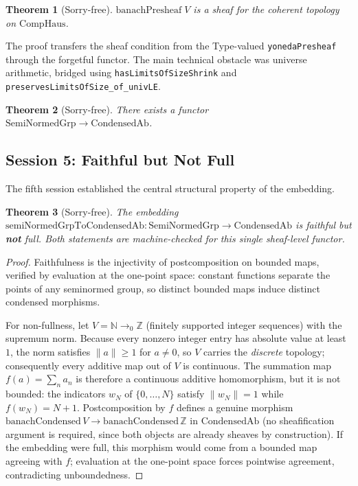 \documentclass[11pt]{amsart}
\theoremstyle{plain}
\newtheorem{theorem}{Theorem}[section]
\theoremstyle{definition}
\newcommand{\CondAb}{\mathrm{CondensedAb}}
\newcommand{\CompHaus}{\mathrm{CompHaus}}
\newcommand{\SemiNormedGrp}{\mathrm{SemiNormedGrp}}
\begin{document}
\begin{theorem}[Sorry-free]
\label{thm:sheaf}
$\mathrm{banachPresheaf}\;V$ is a sheaf for the coherent topology on $\CompHaus$.
\end{theorem}

The proof transfers the sheaf condition from the Type-valued \texttt{yonedaPresheaf} through the forgetful functor. The main technical obstacle was universe arithmetic, bridged using \texttt{hasLimitsOfSizeShrink} and \texttt{preservesLimitsOfSize\_of\_univLE}.

\begin{theorem}[Sorry-free]
There exists a functor $\SemiNormedGrp \to \CondAb$.
\end{theorem}

\subsection{Session 5: Faithful but Not Full}

The fifth session established the central structural property of the embedding.

\begin{theorem}[Sorry-free]
\label{thm:fullness}
The embedding $\mathrm{semiNormedGrpToCondensedAb} : \SemiNormedGrp \to \CondAb$ is faithful but \textbf{not} full. Both statements are machine-checked for this single sheaf-level functor.
\end{theorem}

\begin{proof}
Faithfulness is the injectivity of postcomposition on bounded maps, verified by evaluation at the one-point space: constant functions separate the points of any seminormed group, so distinct bounded maps induce distinct condensed morphisms.

For non-fullness, let $V = \mathbb{N} \to_0 \mathbb{Z}$ (finitely supported integer sequences) with the supremum norm. Because every nonzero integer entry has absolute value at least $1$, the norm satisfies $\|a\| \ge 1$ for $a \neq 0$, so $V$ carries the \emph{discrete} topology; consequently every additive map out of $V$ is continuous. The summation map $f(a) = \sum_n a_n$ is therefore a continuous additive homomorphism, but it is not bounded: the indicators $w_N$ of $\{0, \dots, N\}$ satisfy $\|w_N\| = 1$ while $f(w_N) = N+1$. Postcomposition by $f$ defines a genuine morphism $\mathrm{banachCondensed}\,V \to \mathrm{banachCondensed}\,\mathbb{Z}$ in $\CondAb$ (no sheafification argument is required, since both objects are already sheaves by construction). If the embedding were full, this morphism would come from a bounded map agreeing with $f$; evaluation at the one-point space forces pointwise agreement, contradicting unboundedness.
\end{proof}
\end{document}
